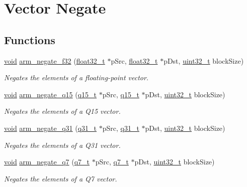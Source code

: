 \hypertarget{group__negate}{\section{Vector Negate}
\label{group__negate}
}
\subsection*{Functions}
\begin{DoxyCompactItemize}
\item 
\hyperlink{group___n_a_m_e_ga18028b8badbf1ea7e704ccac3c488e82}{void} \hyperlink{group__negate_ga2e169c4de6cc6e3ba4be9473531e6657}{arm\-\_\-negate\-\_\-f32} (\hyperlink{arm__math_8h_a4611b605e45ab401f02cab15c5e38715}{float32\-\_\-t} $\ast$p\-Src, \hyperlink{arm__math_8h_a4611b605e45ab401f02cab15c5e38715}{float32\-\_\-t} $\ast$p\-Dst, \hyperlink{stdint_8h_a435d1572bf3f880d55459d9805097f62}{uint32\-\_\-t} block\-Size)
\begin{DoxyCompactList}\small\item\em Negates the elements of a floating-\/point vector. \end{DoxyCompactList}\item 
\hyperlink{group___n_a_m_e_ga18028b8badbf1ea7e704ccac3c488e82}{void} \hyperlink{group__negate_ga0239a833d72cf00290b9723c394e5042}{arm\-\_\-negate\-\_\-q15} (\hyperlink{arm__math_8h_ab5a8fb21a5b3b983d5f54f31614052ea}{q15\-\_\-t} $\ast$p\-Src, \hyperlink{arm__math_8h_ab5a8fb21a5b3b983d5f54f31614052ea}{q15\-\_\-t} $\ast$p\-Dst, \hyperlink{stdint_8h_a435d1572bf3f880d55459d9805097f62}{uint32\-\_\-t} block\-Size)
\begin{DoxyCompactList}\small\item\em Negates the elements of a Q15 vector. \end{DoxyCompactList}\item 
\hyperlink{group___n_a_m_e_ga18028b8badbf1ea7e704ccac3c488e82}{void} \hyperlink{group__negate_ga2784c6887686a73dc7c364e2e41c776c}{arm\-\_\-negate\-\_\-q31} (\hyperlink{arm__math_8h_adc89a3547f5324b7b3b95adec3806bc0}{q31\-\_\-t} $\ast$p\-Src, \hyperlink{arm__math_8h_adc89a3547f5324b7b3b95adec3806bc0}{q31\-\_\-t} $\ast$p\-Dst, \hyperlink{stdint_8h_a435d1572bf3f880d55459d9805097f62}{uint32\-\_\-t} block\-Size)
\begin{DoxyCompactList}\small\item\em Negates the elements of a Q31 vector. \end{DoxyCompactList}\item 
\hyperlink{group___n_a_m_e_ga18028b8badbf1ea7e704ccac3c488e82}{void} \hyperlink{group__negate_gaae78fc079a43bdaa3055f9b32e2a1f4c}{arm\-\_\-negate\-\_\-q7} (\hyperlink{arm__math_8h_ae541b6f232c305361e9b416fc9eed263}{q7\-\_\-t} $\ast$p\-Src, \hyperlink{arm__math_8h_ae541b6f232c305361e9b416fc9eed263}{q7\-\_\-t} $\ast$p\-Dst, \hyperlink{stdint_8h_a435d1572bf3f880d55459d9805097f62}{uint32\-\_\-t} block\-Size)
\begin{DoxyCompactList}\small\item\em Negates the elements of a Q7 vector. \end{DoxyCompactList}\end{DoxyCompactItemize}


